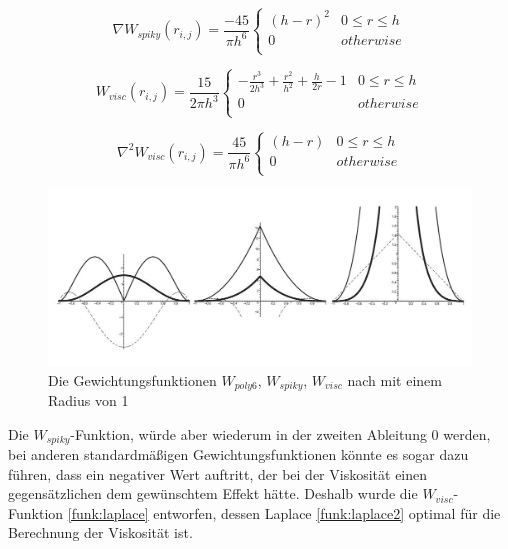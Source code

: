 \documentclass[intern,palatino]{cgBA}
\begin{document}
\begin{equation}\label{funk:gradient2}
\nabla W_{spiky}(r_{i,j}) = \frac{-45}{\pi h^6}   
\begin{cases}
(h - r)^2 		& 0	\leq r \leq h	\\
0					& otherwise			\\
\end{cases}
\end{equation}

\begin{equation}\label{funk:laplace}
W_{visc}(r_{i,j}) = \frac{15}{2 \pi h^3}   
\begin{cases}
-\frac{r^3}{2h^3} + \frac{r^2}{h^2} + \frac{h}{2r} -1  		& 0	\leq r \leq h	\\
0					& otherwise			\\
\end{cases}
\end{equation}

\begin{equation}\label{funk:laplace2}
\nabla ^2 W_{visc}(r_{i,j}) = \frac{45}{\pi h^6}
\begin{cases}
(h-r) 		& 0	\leq r \leq h	\\
0					& otherwise			\\
\end{cases}
\end{equation}

\newpage

\begin{figure}[h]
	\centering
	\includegraphics[width=0.7\columnwidth]{Bilder/kernel.jpg}
	\caption{Die Gewichtungsfunktionen $W_{poly6}$, $W_{spiky}$, $W_{visc}$ nach \cite{muller2003particle} mit einem Radius von 1}
	\label{img:kernel}
\end{figure}
Die $W_{spiky}$-Funktion, würde aber wiederum in der zweiten Ableitung 0 werden, bei anderen standardmäßigen Gewichtungsfunktionen könnte es sogar dazu führen, dass ein negativer Wert auftritt, der bei der Viskosität einen gegensätzlichen dem gewünschtem Effekt hätte. Deshalb wurde die $W_{visc}$-Funktion \ref{funk:laplace} entworfen, dessen Laplace \ref{funk:laplace2} optimal für die Berechnung der Viskosität ist.
\end{document}
